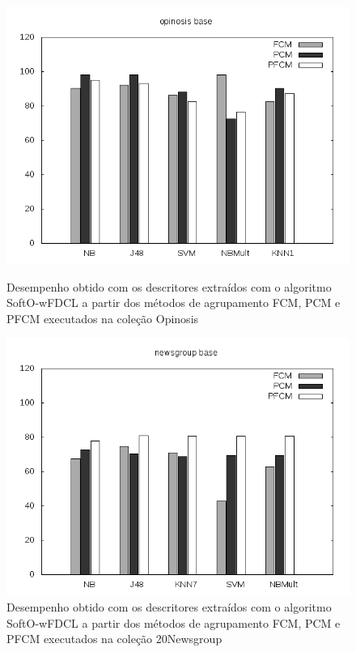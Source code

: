 \begin{figure}[!htp] \centering 
   \begin{minipage}{0.45\textwidth} 
     \centering
    \includegraphics[width=1.0\columnwidth]{assets/pfcm/opinosis} 
    \caption{Desempenho obtido com os descritores extraídos com o algoritmo SoftO-wFDCL a partir dos
      métodos de agrupamento FCM,
    PCM e PFCM executados na coleção Opinosis} 
  \label{fig:pfcmopinosis}
  \end{minipage}\hfill 
  \begin{minipage}{0.45\textwidth} \centering
    \includegraphics[width=1.0\columnwidth]{assets/pfcm/newsgroup} 
    \caption{Desempenho obtido com os descritores extraídos com o algoritmo SoftO-wFDCL a partir dos
      métodos de agrupamento FCM,
    PCM e PFCM executados na coleção 20Newsgroup} 
     \label{fig:pfcm20news} 
   \end{minipage} 
\end{figure}

